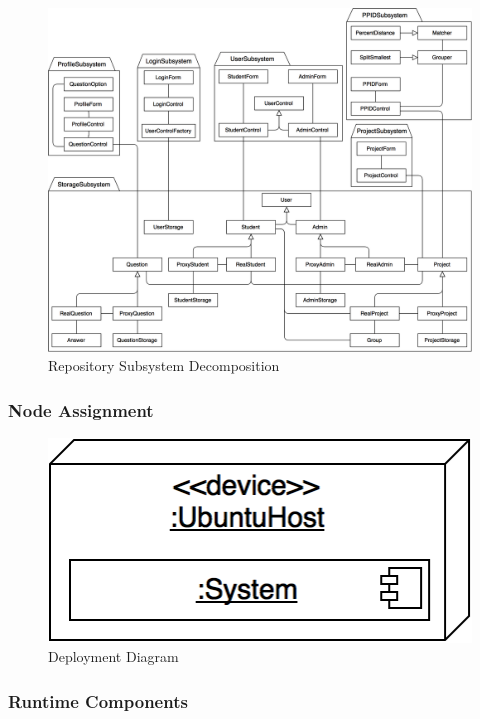 \documentclass[12pt,letterpaper]{article}
\begin{document}
\begin{figure}[H]
	\centering{}
	\includegraphics[scale=0.25]{imgs/d3/decomp/repository.png}
	\caption{Repository Subsystem Decomposition}
\end{figure}

\subsubsection{Node Assignment}

\begin{figure}[H]
	\centering{}
	\includegraphics[scale=0.45]{imgs/d3/decomp/deployment-diagram.png}
	\caption{Deployment Diagram}
\end{figure}

\subsubsection{Runtime Components}
\end{document}
